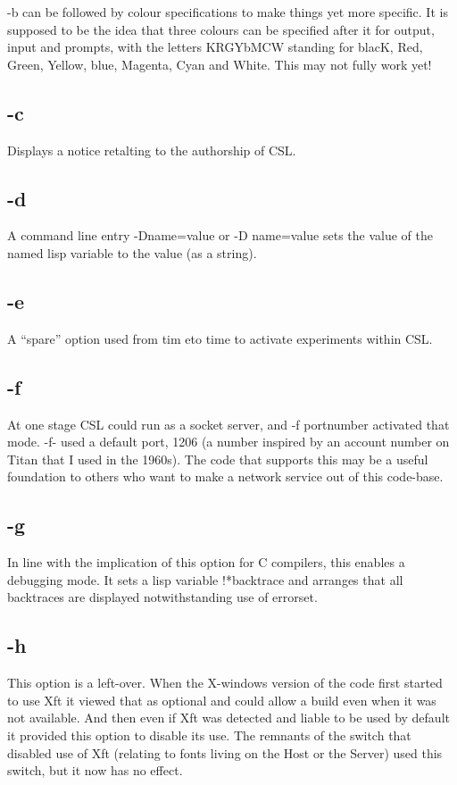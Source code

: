\documentclass[a4paper,11pt]{article}
\begin{document}
{\ttfamily -b} can be followed by colour specifications to make things yet
more specific. It is supposed to be the idea that three colours can be
specified after it for output, input and prompts, with the letters KRGYbMCW
standing for blacK, Red, Green, Yellow, blue, Magenta, Cyan and White. This may
not fully work yet!

\subsection{\ttfamily -c}
Displays a notice retalting to the authorship of CSL.
\subsection{\ttfamily -d}
A command line entry {\ttfamily -Dname=value} or {\ttfamily -D name=value}
sets the value of the named lisp variable to the value (as a string).
\subsection{\ttfamily -e}
A ``spare'' option used from tim eto time to activate experiments within CSL.
\subsection{\ttfamily -f}
At one stage CSL could run as a socket server, and {\ttfamily -f portnumber}
activated that mode. {\ttfamily -f-} used a default port, 1206 (a number
inspired by an account number on Titan that I used in the 1960s). The code
that supports this may be a useful foundation to others who want to make a
network service out of this code-base.
\subsection{\ttfamily -g}
In line with the implication of this option for C compilers, this enables
a debugging mode. It sets a lisp variable {\ttfamily !*backtrace} and arranges
that all backtraces are displayed notwithstanding use of {\ttfamily errorset}.
\subsection{\ttfamily -h}
This option is a left-over. When the X-windows version of the code first
started to use Xft it viewed that as optional and could allow a build even when
it was not available. And then even if Xft was detected and liable to be used
by default it provided this option to disable its use. The remnants of the
switch that disabled use of Xft (relating to fonts living on the Host or
the Server) used this switch, but it now has no effect.
\end{document}
